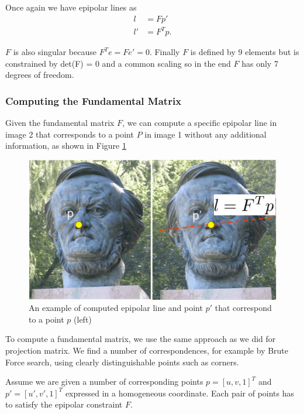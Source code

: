 \documentclass[twoside]{article}
\begin{document}
Once again we have epipolar lines as 
\begin{align}
l &= Fp' \\
l' &= F^Tp.
\end{align}

$F$ is also singular because $F^Te = Fe' = 0$. Finally $F$ is defined by 9 elements but is constrained by det(F) = 0 and a common scaling so in the end $F$ has only 7 degrees of freedom.

\subsubsection{Computing the Fundamental Matrix}

Given the fundamental matrix $F$, we can compute a specific epipolar line in image 2 that corresponds to a point $P$ in image 1 without any additional information, as shown in Figure \ref{ex2}

\begin{figure}[h!]
  \begin{center}
	\includegraphics[scale=0.45]{correspondence3.PNG}  \end{center}
  \caption{An example of computed epipolar line and point $p'$ that correspond to a point $p$ (left)}
  \label{ex2}
\end{figure}

To compute a fundamental matrix, we use the same approach as we did for projection matrix. We find a number of correspondences, for example by Brute Force search, using clearly distinguishable points such as corners. 

Assume we are given a number of corresponding points $p = [u, v, 1]^T$ and $p'= [u',v',1]^T$ expressed in a homogeneous coordinate. Each pair of points has to satisfy the epipolar constraint $F$.
\end{document}
